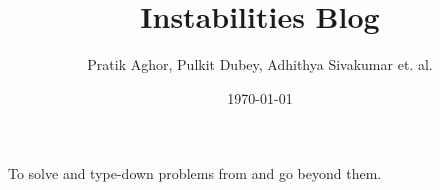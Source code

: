 \documentclass{book}
\author{Pratik Aghor, Pulkit Dubey, Adhithya Sivakumar et. al.}
\title{Instabilities Blog}
\date{\today}  %
\begin{document}
\maketitle
To solve and type-down problems from \cite{drazin2004hydrodynamic} and go beyond them. 





 \if@openright\cleardoublepage\else\clearpage\fi
 \cleardoublepage
 \pagestyle{empty}
\end{document}
